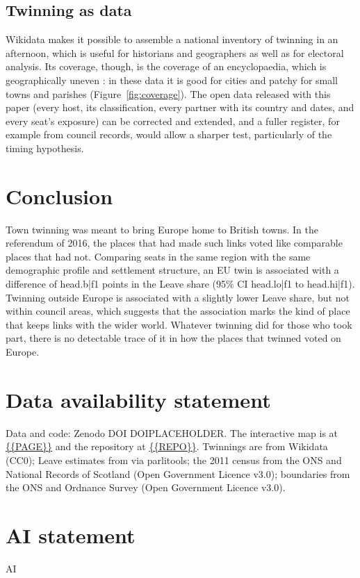\documentclass[11pt,a4paper]{article}
\begin{document}
\subsection{Twinning as data}
Wikidata makes it possible to assemble a national inventory of twinning in an afternoon, which is useful for historians and geographers as well as for electoral analysis. Its coverage, though, is the coverage of an encyclopaedia, which is geographically uneven \citep{graham2014}: in these data it is good for cities and patchy for small towns and parishes (Figure~\ref{fig:coverage}). The open data released with this paper (every host, its classification, every partner with its country and dates, and every seat's exposure) can be corrected and extended, and a fuller register, for example from council records, would allow a sharper test, particularly of the timing hypothesis.

\section{Conclusion}\label{sec:concl}
Town twinning was meant to bring Europe home to British towns. In the referendum of 2016, the places that had made such links voted like comparable places that had not. Comparing seats in the same region with the same demographic profile and settlement structure, an EU twin is associated with a difference of {{head.b|f1}} points in the Leave share (95\% CI {{head.lo|f1}} to {{head.hi|f1}}). Twinning outside Europe is associated with a slightly lower Leave share, but not within council areas, which suggests that the association marks the kind of place that keeps links with the wider world. Whatever twinning did for those who took part, there is no detectable trace of it in how the places that twinned voted on Europe.

\section*{Data availability statement}
Data and code: Zenodo DOI DOIPLACEHOLDER. The interactive map is at \url{{{PAGE}}} and the repository at \url{{{REPO}}}. Twinnings are from Wikidata (CC0); Leave estimates from \citet{hanretty2017} via parlitools; the 2011 census from the ONS and National Records of Scotland (Open Government Licence v3.0); boundaries from the ONS and Ordnance Survey (Open Government Licence v3.0).

\section*{AI statement}
{{AI}}
\end{document}
